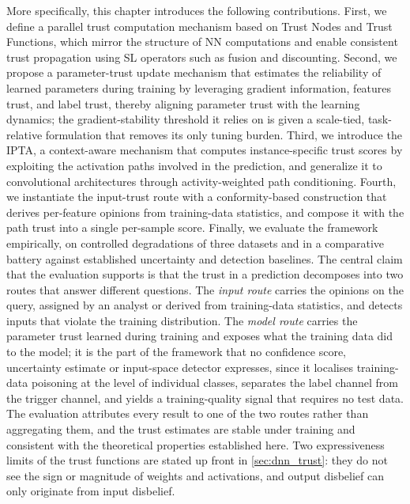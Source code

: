 More specifically, this chapter introduces the following contributions. First, we define a parallel trust computation mechanism based on Trust Nodes and Trust Functions, which mirror the structure of \ac{NN} computations and enable consistent trust propagation using \ac{SL} operators such as fusion and discounting. Second, we propose a parameter-trust update mechanism that estimates the reliability of learned parameters during training by leveraging gradient information, features trust, and label trust, thereby aligning parameter trust with the learning dynamics; the gradient-stability threshold it relies on is given a scale-tied, task-relative formulation that removes its only tuning burden. Third, we introduce the \ac{IPTA}, a context-aware mechanism that computes instance-specific trust scores by exploiting the activation paths involved in the prediction, and generalize it to convolutional architectures through activity-weighted path conditioning. Fourth, we instantiate the input-trust route with a conformity-based construction that derives per-feature opinions from training-data statistics, and compose it with the path trust into a single per-sample score. Finally, we evaluate the framework empirically, on controlled degradations of three datasets and in a comparative battery against established uncertainty and detection baselines. The central claim that the evaluation supports is that the trust in a prediction decomposes into two routes that answer different questions. The \emph{input route} carries the opinions on the query, assigned by an analyst or derived from training-data statistics, and detects inputs that violate the training distribution. The \emph{model route} carries the parameter trust learned during training and exposes what the training data did to the model; it is the part of the framework that no confidence score, uncertainty estimate or input-space detector expresses, since it localises training-data poisoning at the level of individual classes, separates the label channel from the trigger channel, and yields a training-quality signal that requires no test data. The evaluation attributes every result to one of the two routes rather than aggregating them, and the trust estimates are stable under training and consistent with the theoretical properties established here. Two expressiveness limits of the trust functions are stated up front in \cref{sec:dnn_trust}: they do not see the sign or magnitude of weights and activations, and output disbelief can only originate from input disbelief.

